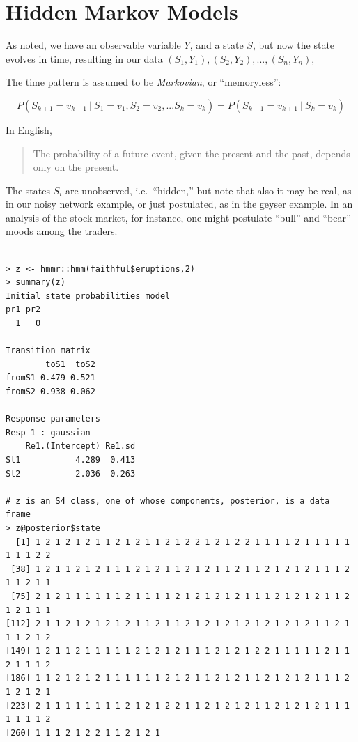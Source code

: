 \documentclass[11pt]{article}
\begin{document}
\section{Hidden Markov Models}

As noted, we have an observable variable $Y$, and a state $S$, but now
the state evolves in time, resulting in our data
$
(S_1,Y_1),
(S_2,Y_2),
...,
(S_n,Y_n),
$

The time pattern is assumed to be \textit{Markovian}, or ``memoryless'':

\begin{equation}
P(S_{k+1} = v_{k+1} ~|~ S_1 = v_1, S_2 = v_2, ...  S_k = v_k) =
P(S_{k+1} = v_{k+1} ~|~ S_k = v_k) 
\end{equation}

In English,

\begin{quote}
The probability of a future event, given the present and the past,
depends only on the present.
\end{quote}

The states $S_i$ are unobserved, i.e.\ ``hidden,'' but note that also it
may be real, as in our noisy network example, or just postulated, as in
the geyser example.  In an analysis of the stock market, for instance,
one might postulate ``bull'' and ``bear'' moods among the traders.

\begin{lstlisting}

> z <- hmmr::hmm(faithful$eruptions,2)
> summary(z)
Initial state probabilities model 
pr1 pr2 
  1   0 

Transition matrix 
        toS1  toS2
fromS1 0.479 0.521
fromS2 0.938 0.062

Response parameters 
Resp 1 : gaussian 
    Re1.(Intercept) Re1.sd
St1           4.289  0.413
St2           2.036  0.263

# z is an S4 class, one of whose components, posterior, is a data frame
> z@posterior$state
  [1] 1 2 1 2 1 2 1 1 2 1 2 1 1 2 1 2 2 1 2 1 2 2 1 1 1 1 2 1 1 1 1 1 1 1 1 2 2
 [38] 1 2 1 1 2 1 2 1 1 1 2 1 2 1 1 2 1 2 1 1 2 1 1 2 1 2 1 2 1 1 1 2 1 1 2 1 1
 [75] 2 1 2 1 1 1 1 1 1 2 1 1 1 1 2 1 2 1 2 1 2 1 1 1 2 1 2 1 2 1 1 2 1 2 1 1 1
[112] 2 1 1 2 1 2 1 2 1 2 1 1 2 1 1 2 1 2 1 2 1 2 1 2 1 2 1 2 1 1 2 1 1 1 2 1 2
[149] 1 2 1 1 2 1 1 1 1 1 2 1 2 1 2 1 1 1 2 1 2 1 2 2 1 1 1 1 1 2 1 1 2 1 1 1 2
[186] 1 1 2 1 2 1 2 1 1 1 1 1 1 2 1 2 1 1 2 1 2 1 1 2 1 2 1 2 1 1 1 2 1 2 1 2 1
[223] 2 1 1 1 1 1 1 1 1 2 1 2 1 2 2 1 1 2 1 2 1 2 1 1 2 1 2 1 2 1 1 1 1 1 1 1 2
[260] 1 1 1 2 1 2 2 1 1 2 1 2 1

\end{lstlisting}
\end{document}
